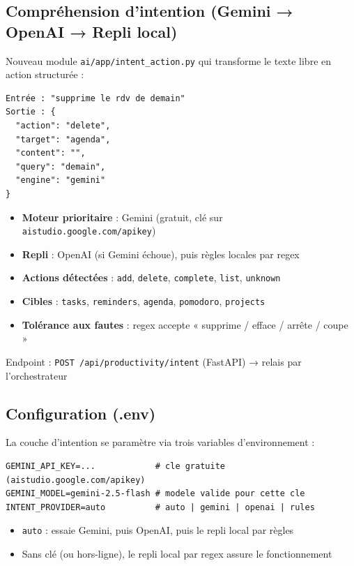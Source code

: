\documentclass[12pt,a4paper]{article}
\begin{document}
\subsection*{Compréhension d'intention (Gemini → OpenAI → Repli local)}

Nouveau module \texttt{ai/app/intent\_action.py} qui transforme le texte libre en action structurée :

\begin{lstlisting}
Entrée : "supprime le rdv de demain"
Sortie : {
  "action": "delete",
  "target": "agenda",
  "content": "",
  "query": "demain",
  "engine": "gemini"
}
\end{lstlisting}

\begin{itemize}
  \item \textbf{Moteur prioritaire} : Gemini (gratuit, clé sur \texttt{aistudio.google.com/apikey})
  \item \textbf{Repli} : OpenAI (si Gemini échoue), puis règles locales par regex
  \item \textbf{Actions détectées} : \texttt{add}, \texttt{delete}, \texttt{complete}, \texttt{list}, \texttt{unknown}
  \item \textbf{Cibles} : \texttt{tasks}, \texttt{reminders}, \texttt{agenda}, \texttt{pomodoro}, \texttt{projects}
  \item \textbf{Tolérance aux fautes} : regex accepte « supprime / efface / arrête / coupe »
\end{itemize}

Endpoint : \texttt{POST /api/productivity/intent} (FastAPI) → relais par l'orchestrateur

\subsection*{Configuration (.env)}

La couche d'intention se paramètre via trois variables d'environnement :

\begin{lstlisting}
GEMINI_API_KEY=...            # cle gratuite (aistudio.google.com/apikey)
GEMINI_MODEL=gemini-2.5-flash # modele valide pour cette cle
INTENT_PROVIDER=auto          # auto | gemini | openai | rules
\end{lstlisting}

\begin{itemize}
  \item \texttt{auto} : essaie Gemini, puis OpenAI, puis le repli local par règles
  \item Sans clé (ou hors-ligne), le repli local par regex assure le fonctionnement
\end{itemize}
\end{document}
